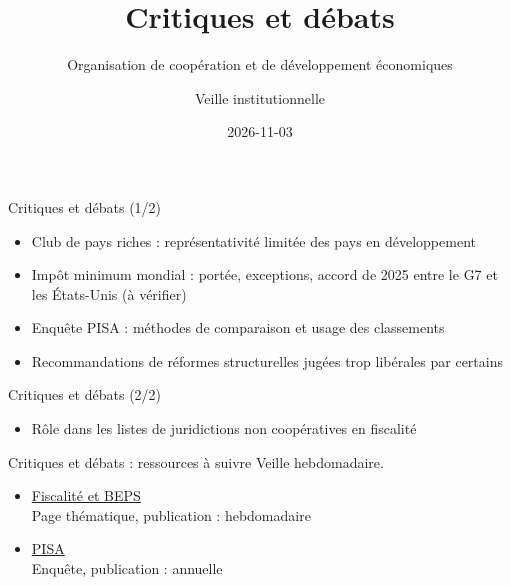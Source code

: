 \documentclass[aspectratio=169,11pt]{beamer}
\title{Critiques et débats}
\subtitle{Organisation de coopération et de développement économiques}
\author{Veille institutionnelle}
\date{2026-11-03}
\begin{document}
\begin{frame}\titlepage\end{frame}

\begin{frame}{Critiques et débats (1/2)}
\begin{itemize}
\item Club de pays riches : représentativité limitée des pays en développement
\item Impôt minimum mondial : portée, exceptions, accord de 2025 entre le G7 et les États-Unis (à vérifier)
\item Enquête PISA : méthodes de comparaison et usage des classements
\item Recommandations de réformes structurelles jugées trop libérales par certains
\end{itemize}
\end{frame}

\begin{frame}{Critiques et débats (2/2)}
\begin{itemize}
\item Rôle dans les listes de juridictions non coopératives en fiscalité
\end{itemize}
\end{frame}

\begin{frame}{Critiques et débats : ressources à suivre}
\small
Veille hebdomadaire.
\begin{itemize}
\item \href{https://www.oecd.org/en/topics/policy-areas/tax.html}{Fiscalité et BEPS}\\{\footnotesize Page thématique, publication : hebdomadaire}
\item \href{https://www.oecd.org/en/about/programmes/pisa.html}{PISA}\\{\footnotesize Enquête, publication : annuelle}
\end{itemize}
\end{frame}
\end{document}

